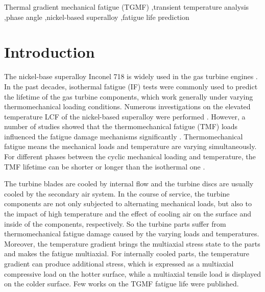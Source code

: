 \documentclass[preprint,5p,twocolumn,10pt,sort&compress]{elsarticle}
\begin{document}
\begin{frontmatter}
%
\begin{keyword}
Thermal gradient mechanical fatigue (TGMF) \sep transient temperature analysis \sep phase angle \sep nickel-based superalloy \sep fatigue life prediction

\end{keyword}
\end{frontmatter}

\section{Introduction}

The nickel-base superalloy Inconel 718 is widely used in the gas turbine engines \cite{Pollock2006}. In the past decades, isothermal fatigue (IF) tests were commonly used to predict the lifetime of the gas turbine components, which work generally under varying thermomechanical loading conditions. Numerous investigations on the elevated temperature LCF of the nickel-based superalloy were performed \cite{Koch85, Morrow88, Mahobia2014, Chen2016}. However, a number of studies showed that the thermomechanical fatigue (TMF) loads influenced the fatigue damage mechanisms significantly \cite{Evans2008, Bauer2009, Kulawinski2015, SCHLESINGER2017242, DENG2019813}. Thermomechanical fatigue means the mechanical loads and temperature are varying simultaneously. For different phases between the cyclic mechanical loading and temperature, the TMF lifetime can be shorter or longer than the isothermal one \cite{SUN2019228}.

The turbine blades are cooled by internal flow and the turbine discs are usually cooled by the secondary air system.
In the course of service, the turbine components are not only subjected to alternating mechanical loads, but also to the impact of high temperature and the effect of cooling air on the surface and inside of the components, respectively. So the turbine parts suffer from thermomechanical fatigue damage caused by the varying loads and temperatures.
Moreover, the temperature gradient brings the multiaxial stress state to the parts and makes the fatigue multiaxial.
For internally cooled parts, the temperature gradient can produce additional stress, which is expressed as a multiaxial compressive load on the hotter surface, while a multiaxial tensile load is displayed on the colder surface.
Few works on the TGMF fatigue life were published.
\end{document}
